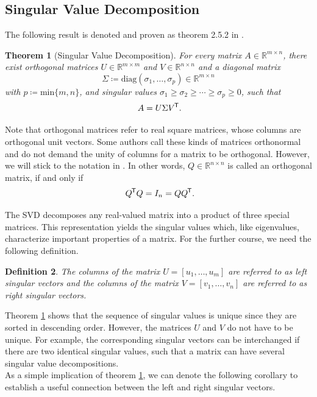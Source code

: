\documentclass[11pt, a4paper]{article}
\newtheorem{theorem}{Theorem}[section]
\newtheorem{definition}[theorem]{Definition}
\newcommand{\R}{\mathbb{R}}
\newcommand*{\tr}{^{\mkern-1.5mu\mathsf{T}}}
\begin{document}
\subsection{Singular Value Decomposition}

The following result is denoted and proven as theorem 2.5.2 in \cite{SVD}.

\begin{theorem}[Singular Value Decomposition] \label{thm:svd}
For every matrix $A \in \R^{m \times n}$, there exist orthogonal matrices $U \in \R^{m \times m}$ and $V \in \R^{n \times n}$ and a diagonal matrix 
\[ \Sigma \coloneq \text{diag}(\sigma_1, \dots, \sigma_p) \in \R^{m \times n} \]
with $p \coloneq \text{min} \{ m,n \}$, and singular values $\sigma_1 \geq \sigma_2 \geq \cdots \geq \sigma_p \geq 0$, such that
\[ A = U \Sigma V\tr . \]
\end{theorem}

Note that orthogonal matrices refer to real square matrices, whose columns are orthogonal unit vectors. Some authors call these kinds of matrices orthonormal and do not demand the unity of columns for a matrix to be orthogonal. However, we will stick to the notation in \cite{SVD}. In other words, $Q \in \R^{n \times n}$ is called an orthogonal matrix, if and only if 
\[ Q \tr Q = I_n = Q Q \tr. \]

The SVD decomposes any real-valued matrix into a product of three special matrices. This representation yields the singular values which, like eigenvalues, characterize important properties of a matrix. For the further course, we need the following definition.

\begin{definition}
The columns of the matrix $U = [u_1, \dots, u_m]$ are referred to as left singular vectors and the columns of the matrix $V = [v_1, \dots, v_n]$ are referred to as right singular vectors.
\end{definition}

Theorem \ref{thm:svd} shows that the sequence of singular values is unique since they are sorted in descending order. However, the matrices $U$ and $V$ do not have to be unique. For example, the corresponding singular vectors can be interchanged if there are two identical singular values, such that a matrix can have several singular value decompositions. \\

As a simple implication of theorem \ref{thm:svd}, we can denote the following corollary to establish a useful connection between the left and right singular vectors. 
\end{document}
